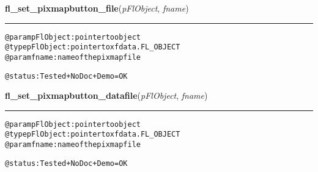     \label{xformslib:flbitmap:fl_set_pixmap_file}

    \vspace{0.5ex}

\hspace{.8\funcindent}\begin{boxedminipage}{\funcwidth}

    \raggedright \textbf{fl\_set\_pixmapbutton\_file}(\textit{pFlObject}, \textit{fname})

    \vspace{-1.5ex}

    \rule{\textwidth}{0.5\fboxrule}
\setlength{\parskip}{2ex}
\begin{alltt}
        @param pFlObject: pointer to object
@type pFlObject: pointer to xfdata.FL\_OBJECT
        @param fname: name of the pixmap file

        @status: Tested + NoDoc + Demo = OK
    
\end{alltt}

\setlength{\parskip}{1ex}
    \end{boxedminipage}

    \label{xformslib:flbitmap:fl_set_pixmap_file}

    \vspace{0.5ex}

\hspace{.8\funcindent}\begin{boxedminipage}{\funcwidth}

    \raggedright \textbf{fl\_set\_pixmapbutton\_datafile}(\textit{pFlObject}, \textit{fname})

    \vspace{-1.5ex}

    \rule{\textwidth}{0.5\fboxrule}
\setlength{\parskip}{2ex}
\begin{alltt}
        @param pFlObject: pointer to object
@type pFlObject: pointer to xfdata.FL\_OBJECT
        @param fname: name of the pixmap file

        @status: Tested + NoDoc + Demo = OK
    
\end{alltt}

\setlength{\parskip}{1ex}
    \end{boxedminipage}

